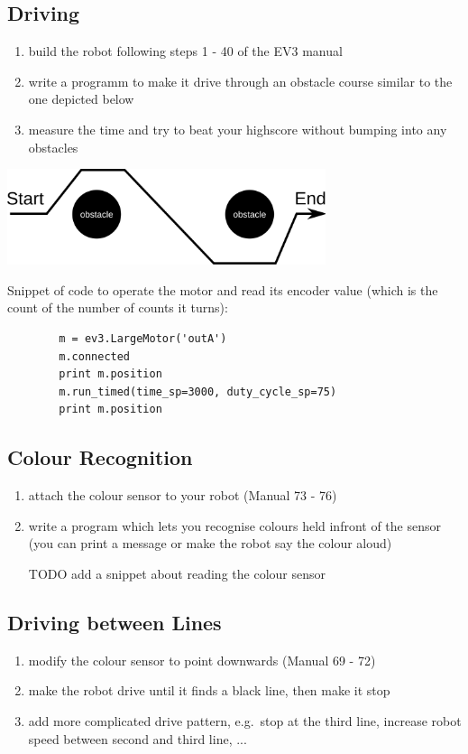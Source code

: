 \documentclass{article}
\begin{document}
  \subsection{Driving}
  \begin{enumerate}
    \item build the robot following steps 1 - 40 of the EV3 manual
    \item write a programm to make it drive through an obstacle course similar 
        to the one depicted below
    \item measure the time and try to beat your highscore without bumping 
        into any obstacles
  \end{enumerate}

    \begin{center}
        \includegraphics[width=0.7\textwidth]{obstacle_course}
    \end{center}

    Snippet of code to operate the motor and read its encoder value
    (which is the count of the number of counts it turns): \\
    \begin{verbatim}
        m = ev3.LargeMotor('outA')
        m.connected
        print m.position
        m.run_timed(time_sp=3000, duty_cycle_sp=75)
        print m.position
    \end{verbatim}

  \subsection{Colour Recognition}
  \begin{enumerate}
      \item attach the colour sensor to your robot (Manual 73 - 76) 
    \item write a program which lets you recognise colours held infront of the sensor (you
        can print a message or make the robot say the colour aloud)

        TODO add a snippet about reading the colour sensor
  \end{enumerate}

  \subsection{Driving between Lines}
  \begin{enumerate}
      \item modify the colour sensor to point downwards (Manual 69 - 72)
      \item make the robot drive until it finds a black line, then make it stop
      \item add more complicated drive pattern, e.g.\ stop at the third line, increase
          robot speed between second and third line, ...
  \end{enumerate}
\end{document}
